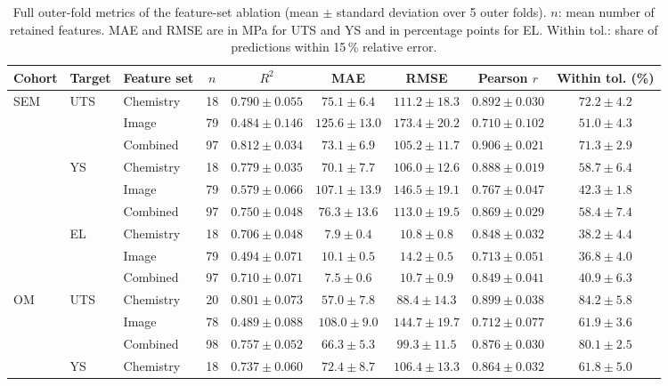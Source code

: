 \begin{table}[t]
\centering
\caption{Full outer-fold metrics of the feature-set ablation (mean $\pm$ standard deviation
over 5 outer folds). $n$: mean number of retained features. MAE and RMSE are in MPa for
UTS and YS and in percentage points for EL. Within tol.: share of predictions within
15\,\% relative error.}
\label{tab:ablation_full}
\scriptsize
\begin{tabular}{lllcccccc}
\toprule
Cohort & Target & Feature set & $n$ & $R^2$ & MAE & RMSE & Pearson $r$ & Within tol. (\%) \\
\midrule
SEM & UTS & Chemistry & 18 & $0.790 \pm 0.055$ & $75.1 \pm 6.4$ & $111.2 \pm 18.3$ & $0.892 \pm 0.030$ & $72.2 \pm 4.2$ \\
 &  & Image & 79 & $0.484 \pm 0.146$ & $125.6 \pm 13.0$ & $173.4 \pm 20.2$ & $0.710 \pm 0.102$ & $51.0 \pm 4.3$ \\
 &  & Combined & 97 & $0.812 \pm 0.034$ & $73.1 \pm 6.9$ & $105.2 \pm 11.7$ & $0.906 \pm 0.021$ & $71.3 \pm 2.9$ \\ \addlinespace
 & YS & Chemistry & 18 & $0.779 \pm 0.035$ & $70.1 \pm 7.7$ & $106.0 \pm 12.6$ & $0.888 \pm 0.019$ & $58.7 \pm 6.4$ \\
 &  & Image & 79 & $0.579 \pm 0.066$ & $107.1 \pm 13.9$ & $146.5 \pm 19.1$ & $0.767 \pm 0.047$ & $42.3 \pm 1.8$ \\
 &  & Combined & 97 & $0.750 \pm 0.048$ & $76.3 \pm 13.6$ & $113.0 \pm 19.5$ & $0.869 \pm 0.029$ & $58.4 \pm 7.4$ \\ \addlinespace
 & EL & Chemistry & 18 & $0.706 \pm 0.048$ & $7.9 \pm 0.4$ & $10.8 \pm 0.8$ & $0.848 \pm 0.032$ & $38.2 \pm 4.4$ \\
 &  & Image & 79 & $0.494 \pm 0.071$ & $10.1 \pm 0.5$ & $14.2 \pm 0.5$ & $0.713 \pm 0.051$ & $36.8 \pm 4.0$ \\
 &  & Combined & 97 & $0.710 \pm 0.071$ & $7.5 \pm 0.6$ & $10.7 \pm 0.9$ & $0.849 \pm 0.041$ & $40.9 \pm 6.3$ \\ \addlinespace
\midrule
OM & UTS & Chemistry & 20 & $0.801 \pm 0.073$ & $57.0 \pm 7.8$ & $88.4 \pm 14.3$ & $0.899 \pm 0.038$ & $84.2 \pm 5.8$ \\
 &  & Image & 78 & $0.489 \pm 0.088$ & $108.0 \pm 9.0$ & $144.7 \pm 19.7$ & $0.712 \pm 0.077$ & $61.9 \pm 3.6$ \\
 &  & Combined & 98 & $0.757 \pm 0.052$ & $66.3 \pm 5.3$ & $99.3 \pm 11.5$ & $0.876 \pm 0.030$ & $80.1 \pm 2.5$ \\ \addlinespace
 & YS & Chemistry & 18 & $0.737 \pm 0.060$ & $72.4 \pm 8.7$ & $106.4 \pm 13.3$ & $0.864 \pm 0.032$ & $61.8 \pm 5.0$ \\

\end{tabular}
\end{table}
